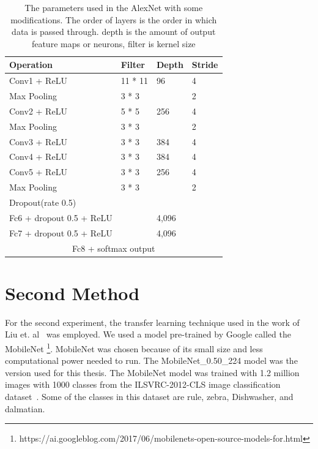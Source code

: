 \documentclass[12pt, a4paper,oneside]{report}
\begin{document}
\begin{table}[!htbp]
	\centering {} \small
	\begin{adjustbox}{max width=1.1\textwidth,center}
		
		\begin{tabular}{|p{3cm}|p{3cm}|p{3cm}|p{3cm}|}
			\hline	
			Operation & Filter & Depth & Stride \\ \hline
			
			Conv1 + ReLU  &  11 * 11  & 96  & 4 \\  \hline	 
			
			Max Pooling & 3 * 3  &  & 2 \\ \hline	   
			
			Conv2 + ReLU & 5 * 5 & 256  & 4 \\ \hline	
			
			Max Pooling & 3 * 3 & & 2 \\ \hline
			
			Conv3 + ReLU & 3 * 3 & 384 & 4 \\ \hline	
			
			Conv4 + ReLU & 3 * 3  & 384  & 4 \\ \hline	
			
			Conv5 + ReLU & 3 * 3  & 256 & 4 \\ \hline	
			
			Max Pooling & 3 * 3 & & 2 \\ \hline
			
			Dropout(rate 0.5) &  & & \\ \hline
			
			Fc6 + dropout 0.5 + ReLU & & 4,096 & \\ \hline
			
			Fc7 + dropout 0.5 + ReLU & &  4,096 & \\ \hline
			
			\multicolumn{4}{|c|}{
				Fc8  + softmax output} \\
			\hline
		\end{tabular}	
	\end{adjustbox}
	\caption {The parameters used in the AlexNet with some modifications. The order of layers is the order in which
		data is passed through. depth is the amount of output feature maps or neurons, filter is kernel
		size}	
	\label{table:para}
\end{table}



\section{Second Method}
For the second experiment, the transfer learning technique used in the work of Liu et. al~\cite{liu2015chart} was employed. We used a model pre-trained by Google called the MobileNet \footnote{https://ai.googleblog.com/2017/06/mobilenets-open-source-models-for.html}. MobileNet was chosen because of its small size and less computational power needed to run. The MobileNet\_0.50\_224 model was the version used for this thesis. The MobileNet model was trained with 1.2 million images with 1000 classes from the ILSVRC-2012-CLS image classification dataset~\cite{ILSVRC15}. Some of the classes in this dataset are rule, zebra, Dishwasher, and dalmatian.
\end{document}
